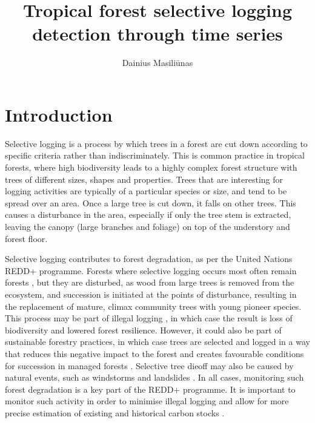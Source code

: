 \documentclass[a4paper,10pt]{article}
\title{Tropical forest selective logging detection through time series}
\author{Dainius Masiliūnas}
\begin{document}
\maketitle

\section{Introduction}

Selective logging is a process by which trees in a forest are cut down according to specific criteria rather than indiscriminately. This is common practice in tropical forests, where high biodiversity leads to a highly complex forest structure with trees of different sizes, shapes and properties. Trees that are interesting for logging activities are typically of a particular species or size, and tend to be spread over an area. Once a large tree is cut down, it falls on other trees. This causes a disturbance in the area, especially if only the tree stem is extracted, leaving the canopy (large branches and foliage) on top of the understory and forest floor.

Selective logging contributes to forest degradation, as per the United Nations \ac{REDD+} programme. Forests where selective logging occurs most often remain forests \citep{asner_condition_2006}, but they are disturbed, as wood from large trees is removed from the ecosystem, and succession is initiated at the points of disturbance, resulting in the replacement of mature, climax community trees with young pioneer species. This process may be part of illegal logging \citep{rutishauser_rapid_2015}, in which case the result is loss of biodiversity and lowered forest resilience. However, it could also be part of sustainable forestry practices, in which case trees are selected and logged in a way that reduces this negative impact to the forest and creates favourable conditions for succession in managed forests \citep{west_forest_2014, keller_4._2004}. Selective tree dieoff may also be caused by natural events, such as windstorms and landslides \citep{frolking_forest_2009}. In all cases, monitoring such forest degradation is a key part of the \ac{REDD+} programme. It is important to monitor such activity in order to minimise illegal logging and allow for more precise estimation of existing and historical carbon stocks \citep{piponiot_carbon_2016, pinard_simulated_2000}.
\end{document}
